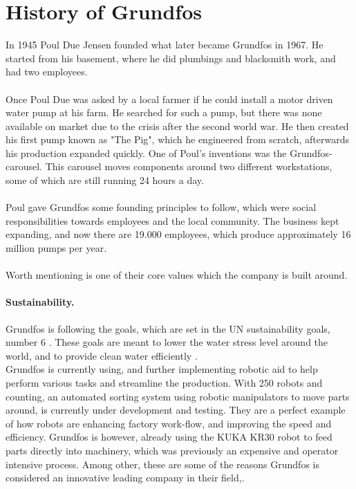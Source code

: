 \section{History of Grundfos} \label{ch:History of Grundfos}

In 1945 Poul Due Jensen founded what later became Grundfos in 1967. He started from his basement, where he did plumbings and blacksmith work, and had two employees\cite{documentray}.\\
\\
Once Poul Due was asked by a local farmer if he could install a motor driven water pump at his farm. He searched for such a pump, but there was none available on market due to the crisis after the second world war. 
He then created his first pump known as "The Pig", which he engineered from scratch, afterwards his production expanded quickly. 
One of Poul's inventions was the Grundfos-carousel. This carousel moves components around two different workstations, some of which are still running 24 hours a day\cite{documentray}.\\
\\
Poul gave Grundfos some founding principles to follow, which were social responsibilities towards employees and the local community.
The business kept expanding, and now there are 19.000 employees, which produce approximately 16 million pumps per year\cite{1Grundfos}.\\
\\
Worth mentioning is one of their core values which the company is built around.\\

   
\paragraph{Sustainability.} Grundfos is following the goals, which are set in the UN sustainability goals, number 6 \cite{Ggoal6}. These goals are meant to lower the water stress level around the world, and to provide clean water efficiently \cite{goal6}.\\
Grundfos is currently using, and further implementing robotic aid to help perform various tasks and streamline the production. With 250 robots and counting, an automated sorting system using robotic manipulators to move parts around, is currently under development and testing. They are a perfect example of how robots are enhancing factory work-flow, and improving the speed and efficiency.  Grundfos is however, already using the KUKA KR30 robot to feed parts directly into machinery, which was previously an expensive and operator intensive process. Among other, these are some of the reasons Grundfos is considered an innovative leading company in their field\cite{1Grundfos},\cite{Grundfosrobot}. 

